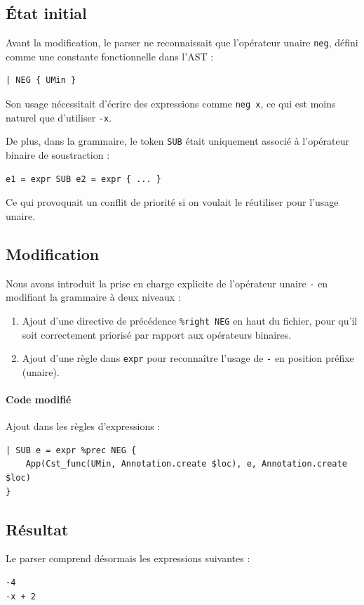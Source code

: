 \subsection*{État initial}
Avant la modification, le parser ne reconnaissait que l'opérateur unaire \texttt{neg}, défini comme une constante fonctionnelle dans l’AST :
\begin{lstlisting}
| NEG { UMin }
\end{lstlisting}
Son usage nécessitait d'écrire des expressions comme \texttt{neg x}, ce qui est moins naturel que d'utiliser \texttt{-x}.

De plus, dans la grammaire, le token \texttt{SUB} était uniquement associé à l’opérateur binaire de soustraction :
\begin{lstlisting}
e1 = expr SUB e2 = expr { ... }
\end{lstlisting}
Ce qui provoquait un conflit de priorité si on voulait le réutiliser pour l'usage unaire.

\subsection*{Modification}
Nous avons introduit la prise en charge explicite de l'opérateur unaire \texttt{-} en modifiant la grammaire à deux niveaux :
\begin{enumerate}
    \item Ajout d’une directive de précédence \texttt{\%right NEG} en haut du fichier, pour qu’il soit correctement priorisé par rapport aux opérateurs binaires.
    \item Ajout d’une règle dans \texttt{expr} pour reconnaître l’usage de \texttt{-} en position préfixe (unaire).
\end{enumerate}

\paragraph{Code modifié}
Ajout dans les règles d'expressions :
\begin{lstlisting}
| SUB e = expr %prec NEG {
    App(Cst_func(UMin, Annotation.create $loc), e, Annotation.create $loc)
}
\end{lstlisting}

\subsection*{Résultat}
Le parser comprend désormais les expressions suivantes :
\begin{lstlisting}
-4
-x + 2
\end{lstlisting}

